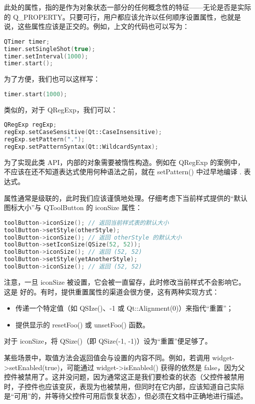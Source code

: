 此处的属性，指的是作为对象状态一部分的任何概念性的特征——无论是否是实际的 Q\_PROPERTY。只要可行，用户都应该允许以任何顺序设置属性，也就是说，这些属性应该是正交的。例如，上文的代码也可以写为：

\begin{lstlisting}[language=C++]
QTimer timer;
timer.setSingleShot(true);
timer.setInterval(1000);
timer.start(); 
\end{lstlisting}

为了方便，我们也可以这样写：

\begin{lstlisting}[language=C++]
timer.start(1000);
\end{lstlisting}

类似的，对于 QRegExp，我们可以：

\begin{lstlisting}[language=C++]
QRegExp regExp;
regExp.setCaseSensitive(Qt::CaseInsensitive);
regExp.setPattern(".");
regExp.setPatternSyntax(Qt::WildcardSyntax);
\end{lstlisting}

为了实现此类 API，内部的对象需要被惰性构造。例如在 QRegExp 的案例中，不应该在还不知道表达式使用何种语法之前，就在 setPattern() 中过早地编译 . 表达式。

属性通常是级联的，此时我们应该谨慎地处理。仔细考虑下当前样式提供的“默认图标大小”与 QToolButton 的 iconSize 属性：

\begin{lstlisting}[language=C++]
toolButton->iconSize(); // 返回当前样式表的默认大小
toolButton->setStyle(otherStyle);
toolButton->iconSize(); // 返回 otherStyle 的默认大小
toolButton->setIconSize(QSize(52, 52));
toolButton->iconSize(); // 返回 (52, 52)
toolButton->setStyle(yetAnotherStyle);
toolButton->iconSize(); // 返回 (52, 52) 
\end{lstlisting}


注意，一旦 iconSize 被设置，它会被一直留存，此时修改当前样式不会影响它。这是 好的。有时，提供重置属性的渠道会很方便，这有两种实现方式：

\begin{itemize}
	\item 传递一个特定值（如 QSIze()、-1 或 Qt::Alignment(0)）来指代“重置”；
	\item 提供显示的 resetFoo() 或 unsetFoo() 函数。
\end{itemize}

对于 iconSize，将 QSize()（即 QSize(-1, -1)）设为“重置”便足够了。

某些场景中，取值方法会返回值会与设置的内容不同。例如，若调用 widget->setEnabled(true)，可能通过 widget->isEnabled() 获得的依然是 false，因为父控件被禁用了。这并没问题，因为通常这正是我们要检查的状态（父控件被禁用时，子控件也应该变灰，表现为也被禁用，但同时在它内部，应该知道自己实际是“可用”的，并等待父控件可用后恢复状态），但必须在文档中正确地进行描述。

